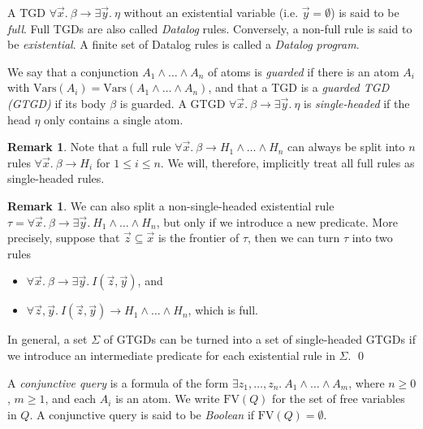 \documentclass[12pt]{report}
\theoremstyle{plain}
\theoremstyle{definition}
\newtheorem{remark}[theorem]{Remark}
\def\FV{{\mathrm{FV}}}
\def\Vars{{\mathrm{Vars}}}
\begin{document}
A TGD $\forall \vec{x}.\ \beta \rightarrow \exists \vec{y}.\ \eta$ without an existential variable (i.e. $\vec{y} = \emptyset$) is said to be \emph{full}. Full TGDs are also called \emph{Datalog} rules. Conversely, a non-full rule is said to be \emph{existential}. A finite set of Datalog rules is called a \emph{Datalog program}.

We say that a conjunction $A_1 \wedge \ldots \wedge A_n$ of atoms is \emph{guarded} if there is an atom $A_i$ with $\Vars(A_i) = \Vars(A_1 \wedge \ldots \wedge A_n)$, and that a TGD is a \emph{guarded TGD (GTGD)} if its body $\beta$ is guarded. A GTGD $\forall \vec{x}.\ \beta \rightarrow \exists \vec{y}.\ \eta$ is \emph{single-headed} if the head $\eta$ only contains a single atom.

\begin{remark}
  Note that a full rule $\forall \vec{x}.\ \beta \rightarrow H_1 \wedge \ldots \wedge H_n$ can always be split into $n$ rules $\forall \vec{x}.\ \beta \rightarrow H_i$ for $1 \leq i \leq n$. We will, therefore, implicitly treat all full rules as single-headed rules.
\end{remark}

\begin{remark}
  We can also split a non-single-headed existential rule $\tau = \forall \vec{x}.\ \beta \rightarrow \exists \vec{y}.\ H_1 \wedge \ldots \wedge H_n$, but only if we introduce a new predicate. More precisely, suppose that $\vec{z} \subseteq \vec{x}$ is the frontier of $\tau$, then we can turn $\tau$ into two rules
  \begin{itemize}
    \item $\forall \vec{x}.\ \beta \rightarrow \exists \vec{y}.\ I(\vec{z}, \vec{y})$, and
    \item $\forall \vec{z}, \vec{y}.\ I(\vec{z}, \vec{y}) \rightarrow H_1 \wedge \ldots \wedge H_n$, which is full.
  \end{itemize}

  In general, a set $\Sigma$ of GTGDs can be turned into a set of single-headed GTGDs if we introduce an intermediate predicate for each existential rule in $\Sigma$.
  \qed
\end{remark}

A \emph{conjunctive query} is a formula of the form $\exists z_1, \ldots, z_n.\ A_1 \wedge \ldots \wedge A_m$, where $n \geq 0$, $m \geq 1$, and each $A_i$ is an atom. We write $\FV(Q)$ for the set of free variables in $Q$. A conjunctive query is said to be \emph{Boolean} if $\FV(Q) = \emptyset$.
\end{document}
